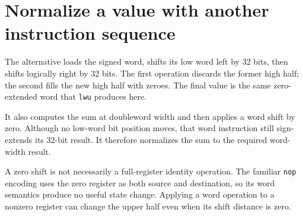 \section{Normalize a value with another instruction
  sequence}\label{004-bit-inspector-p10-normalize-a-value-with-another-instruction-sequence}

The alternative loads the signed word, shifts its low word left by 32
bits, then shifts logically right by 32 bits. The first operation
discards the former high half; the second fills the new high half with
zeroes. The final value is the same zero-extended word that \texttt{lwu}
produces here.

It also computes the sum at doubleword width and then applies a word
shift by zero. Although no low-word bit position moves, that word
instruction still sign-extends its 32-bit result. It therefore
normalizes the sum to the required word-width result.

A zero shift is not necessarily a full-register identity operation. The
familiar \texttt{nop} encoding uses the zero register as both source and
destination, so its word semantics produce no useful state change.
Applying a word operation to a nonzero register can change the upper
half even when its shift distance is zero.
